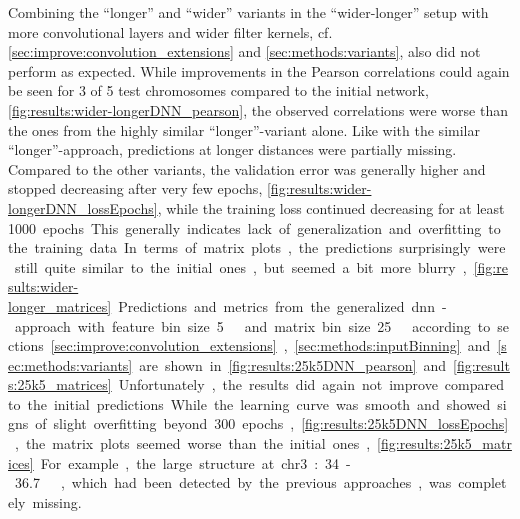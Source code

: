 Combining the ``longer'' and ``wider'' variants in the ``wider-longer'' setup with more convolutional layers and wider 
filter kernels,  cf. \cref{sec:improve:convolution_extensions} and \ref{sec:methods:variants}, also did not perform as expected.
While improvements in the Pearson correlations could again be seen for 3 of 5 test chromosomes compared to the initial network, \cref{fig:results:wider-longerDNN_pearson},
the observed correlations were worse than the ones from the highly similar ``longer''-variant alone. 
Like with the similar ``longer''-approach, predictions at longer distances were partially missing. 
Compared to the other variants, the validation error was generally higher and stopped decreasing after very few epochs, \cref{fig:results:wider-longerDNN_lossEpochs},
while the training loss continued decreasing for at least \SI{1000} epochs. 
This generally indicates lack of generalization and overfitting to the training data.
In terms of matrix plots, the predictions surprisingly were still quite similar to the initial ones, but seemed a bit more blurry, \cref{fig:results:wider-longer_matrices}.

Predictions and metrics from the generalized \acrshort{dnn}-approach with feature bin size \SI{5}{\kilo\bp} and matrix bin size \SI{25}{\kilo\bp}
according to sections \ref{sec:improve:convolution_extensions}, \ref{sec:methods:inputBinning} and \ref{sec:methods:variants} 
are shown in \cref{fig:results:25k5DNN_pearson} and \ref{fig:results:25k5_matrices}.
Unfortunately, the results did again not improve compared to the initial predictions.
While the learning curve was smooth and showed signs of slight overfitting beyond 300 epochs, \cref{fig:results:25k5DNN_lossEpochs},
the matrix plots seemed worse than the initial ones, \cref{fig:results:25k5_matrices}. 
For example, the large structure at chr3:34-\SI{36.7}{\mega\bp}, which had been detected by the previous approaches, was completely missing.

